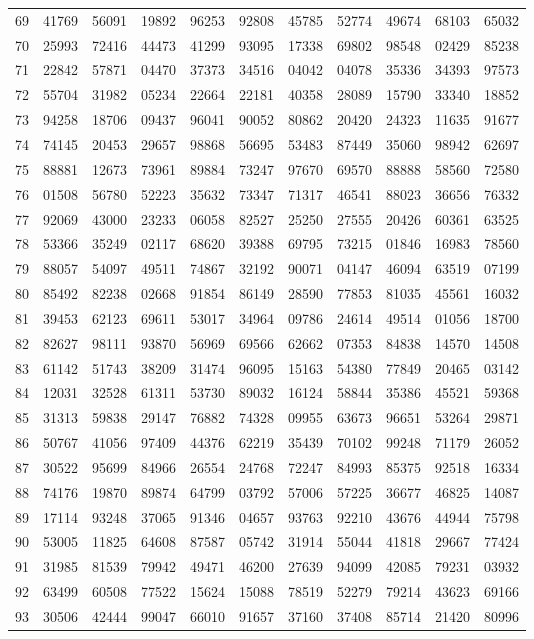 \begin{table}
\begin{otherlanguage}{english}
\begin{tabular}{|C|CCCCCCCCCC|}
69&41769&56091&19892&96253&92808&45785&52774&49674&68103&65032\\[1ex]
70&25993&72416&44473&41299&93095&17338&69802&98548&02429&85238\\
71&22842&57871&04470&37373&34516&04042&04078&35336&34393&97573\\
72&55704&31982&05234&22664&22181&40358&28089&15790&33340&18852\\
73&94258&18706&09437&96041&90052&80862&20420&24323&11635&91677\\
74&74145&20453&29657&98868&56695&53483&87449&35060&98942&62697\\[1ex]
75&88881&12673&73961&89884&73247&97670&69570&88888&58560&72580\\
76&01508&56780&52223&35632&73347&71317&46541&88023&36656&76332\\
77&92069&43000&23233&06058&82527&25250&27555&20426&60361&63525\\
78&53366&35249&02117&68620&39388&69795&73215&01846&16983&78560\\
79&88057&54097&49511&74867&32192&90071&04147&46094&63519&07199\\[1ex]
80&85492&82238&02668&91854&86149&28590&77853&81035&45561&16032\\
81&39453&62123&69611&53017&34964&09786&24614&49514&01056&18700\\
82&82627&98111&93870&56969&69566&62662&07353&84838&14570&14508\\
83&61142&51743&38209&31474&96095&15163&54380&77849&20465&03142\\
84&12031&32528&61311&53730&89032&16124&58844&35386&45521&59368\\[1ex]
85&31313&59838&29147&76882&74328&09955&63673&96651&53264&29871\\
86&50767&41056&97409&44376&62219&35439&70102&99248&71179&26052\\
87&30522&95699&84966&26554&24768&72247&84993&85375&92518&16334\\
88&74176&19870&89874&64799&03792&57006&57225&36677&46825&14087\\
89&17114&93248&37065&91346&04657&93763&92210&43676&44944&75798\\[1ex]
90&53005&11825&64608&87587&05742&31914&55044&41818&29667&77424\\
91&31985&81539&79942&49471&46200&27639&94099&42085&79231&03932\\
92&63499&60508&77522&15624&15088&78519&52279&79214&43623&69166\\
93&30506&42444&99047&66010&91657&37160&37408&85714&21420&80996\\

\end{tabular}
\end{otherlanguage}
\end{table}
